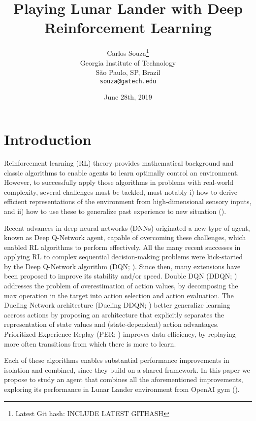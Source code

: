 \documentclass{article}
\title{Playing Lunar Lander with Deep Reinforcement Learning}
\date{June 28th, 2019}
\author{
Carlos Souza\thanks{Latest Git hash: INCLUDE LATEST GITHASH}\\
Georgia Institute of Technology\\
São Paulo, SP, Brazil \\
\texttt{souza@gatech.edu} \\
}
\begin{document}
    \maketitle

    \begin{abstract}
        \lipsum[1]
    \end{abstract}




    \section{Introduction}
    \label{sec:introduction}
    Reinforcement learning (RL) theory provides mathematical background and classic algorithms to enable agents to learn optimally control an environment.
    However, to successfully apply those algorithms in problems with real-world complexity, several challenges must be tackled, must notably i) how to derive efficient representations of the environment from high-dimensional sensory inputs, and ii) how to use these to generalize past experience to new situation (\cite{dqn}).

    Recent advances in deep neural networks (DNNs) originated a new type of agent, known as Deep Q-Network agent, capable of overcoming these challenges, which enabled RL algorithms to perform effectively.
    All the many recent successes in applying RL to complex sequential decision-making problems were kick-started by the Deep Q-Network algorithm (DQN; \cite{dqn}).
    Since then, many extensions have been proposed to improve its stability and/or speed.
Double DQN (DDQN; \cite{ddqn}) addresses the problem of overestimation of action values, by decomposing the max operation in the target into action selection and action evaluation.
    The Dueling Network architecture (Dueling DDQN; \cite{dueling}) better generalize learning accross actions by proposing an architecture that explicitly separates the representation of state values and (state-dependent) action advantages.
    Prioritized Experience Replay (PER; \cite{per}) improves data efficiency, by replaying more often transitions from which there is more to learn.

    Each of these algorithms enables substantial performance improvements in isolation and combined, since they build on a shared framework.
    In this paper we propose to study an agent that combines all the aforementioned improvements, exploring its performance in Lunar Lander environment from OpenAI gym (\cite{openai}).
\end{document}
